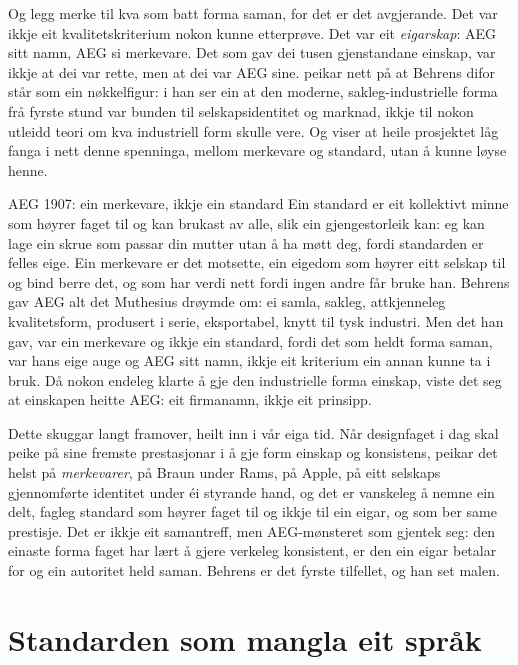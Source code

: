 Og legg merke til kva som batt forma saman, for det er det avgjerande. Det var ikkje eit kvalitetskriterium nokon kunne etterprøve. Det var eit \emph{eigarskap}: AEG sitt namn, AEG si merkevare. Det som gav dei tusen gjenstandane einskap, var ikkje at dei var rette, men at dei var AEG sine. \textcite{banham1960} peikar nett på at Behrens difor står som ein nøkkelfigur: i han ser ein at den moderne, sakleg-industrielle forma frå fyrste stund var bunden til selskapsidentitet og marknad, ikkje til nokon utleidd teori om kva industriell form skulle vere. Og \textcite{schwartz1996werkbund} viser at heile prosjektet låg fanga i nett denne spenninga, mellom merkevare og standard, utan å kunne løyse henne.

\begin{kasus}{AEG 1907: ein merkevare, ikkje ein standard}
Ein standard er eit kollektivt minne som høyrer faget til og kan brukast av alle, slik ein gjengestorleik kan: eg kan lage ein skrue som passar din mutter utan å ha møtt deg, fordi standarden er felles eige. Ein merkevare er det motsette, ein eigedom som høyrer eitt selskap til og bind berre det, og som har verdi nett fordi ingen andre får bruke han. Behrens gav AEG alt det Muthesius drøymde om: ei samla, sakleg, attkjenneleg kvalitetsform, produsert i serie, eksportabel, knytt til tysk industri. Men det han gav, var ein merkevare og ikkje ein standard, fordi det som heldt forma saman, var hans eige auge og AEG sitt namn, ikkje eit kriterium ein annan kunne ta i bruk. Då nokon endeleg klarte å gje den industrielle forma einskap, viste det seg at einskapen heitte AEG: eit firmanamn, ikkje eit prinsipp.
\end{kasus}

Dette skuggar langt framover, heilt inn i vår eiga tid. Når designfaget i dag skal peike på sine fremste prestasjonar i å gje form einskap og konsistens, peikar det helst på \emph{merkevarer}, på Braun under Rams, på Apple, på eitt selskaps gjennomførte identitet under éi styrande hand, og det er vanskeleg å nemne ein delt, fagleg standard som høyrer faget til og ikkje til ein eigar, og som ber same prestisje. Det er ikkje eit samantreff, men AEG-mønsteret som gjentek seg: den einaste forma faget har lært å gjere verkeleg konsistent, er den ein eigar betalar for og ein autoritet held saman. Behrens er det fyrste tilfellet, og han set malen.

\section{Standarden som mangla eit språk}

